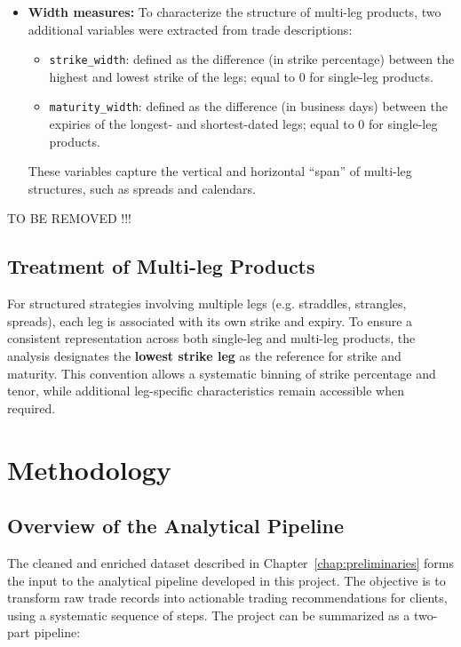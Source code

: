 \documentclass[12pt,a4paper]{report}
\begin{document}
\begin{itemize}
    \item \textbf{Width measures:} 
    To characterize the structure of multi-leg products, two additional variables were extracted from 
    trade descriptions:
    \begin{itemize}
        \item \texttt{strike\_width}: defined as the difference (in strike percentage) between the highest 
        and lowest strike of the legs; equal to 0 for single-leg products.
        \item \texttt{maturity\_width}: defined as the difference (in business days) between the expiries of 
        the longest- and shortest-dated legs; equal to 0 for single-leg products.
    \end{itemize}
    These variables capture the vertical and horizontal ``span'' of multi-leg structures, 
    such as spreads and calendars.


\end{itemize}


TO BE REMOVED !!!
\section{Treatment of Multi-leg Products}

For structured strategies involving multiple legs (e.g. straddles, strangles, spreads), each leg is associated with its own strike and expiry. To ensure a consistent representation across both single-leg and multi-leg products, the analysis designates the \textbf{lowest strike leg} as the reference for strike and maturity. This convention allows a systematic binning of strike percentage and tenor, while additional leg-specific characteristics remain accessible when required.

\chapter{Methodology}

\section{Overview of the Analytical Pipeline}

The cleaned and enriched dataset described in Chapter~\ref{chap:preliminaries} forms the input to the analytical pipeline developed in this project. The objective is to transform raw trade records into actionable trading recommendations for clients, using a systematic sequence of steps. The project can be summarized as a two-part pipeline:
\end{document}
